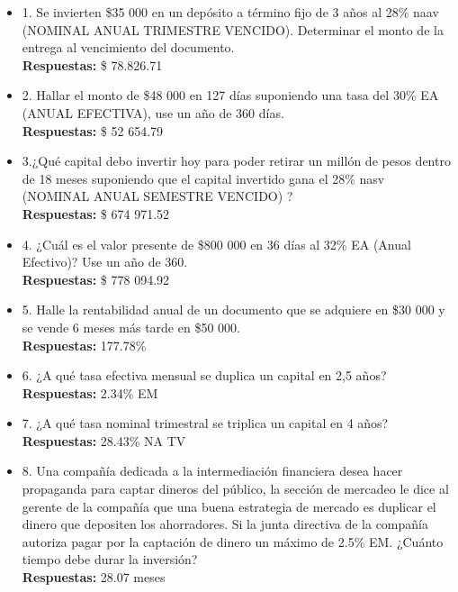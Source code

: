 \begin{itemize}
	
	\item 1.	Se invierten \$35 000 en un depósito a término fijo de 3 años al 28\% naav (NOMINAL ANUAL TRIMESTRE VENCIDO).  Determinar el monto de la entrega al vencimiento del documento.  \\
	\textbf{Respuestas:} \$ 78.826.71
	\medskip
	
	\item 2. Hallar el monto de \$48 000 en 127 días suponiendo una tasa del 30\% EA (ANUAL EFECTIVA), use un año de 360 días.\\
	\textbf{Respuestas:} \$ 52 654.79
	\medskip
	
	\item 3.¿Qué capital debo invertir hoy para poder retirar un millón de pesos dentro de 18 meses suponiendo que el capital invertido gana el 28\%  nasv (NOMINAL ANUAL SEMESTRE VENCIDO) ?\\
	
	\textbf{Respuestas:} \$ 674 971.52
	\medskip
	
	\item 4. ¿Cuál es el valor presente de \$800 000 en 36 días al 32\% EA (Anual Efectivo)? Use un año de 360.\\
	\textbf{Respuestas:} \$ 778 094.92
	\medskip
	
	\item 5. Halle la rentabilidad anual de un documento que se adquiere en \$30 000 y se vende 6 meses más tarde en \$50 000. \\
	\textbf{Respuestas:} 177.78\%
	\medskip
	
	\item 6. ¿A qué tasa efectiva mensual se duplica un capital en 2,5 años?  \\
	\textbf{Respuestas:} 2.34\% EM
	\medskip
	
	\item 7. ¿A qué tasa nominal trimestral se triplica un capital en 4 años?\\
	\textbf{Respuestas:} 28.43\% NA	TV
	\medskip
	
	\item 8. Una compañía dedicada a la intermediación financiera desea hacer propaganda para captar dineros del público, la sección de mercadeo le dice al gerente de la compañía que una buena estrategia de mercado es duplicar el dinero que depositen los ahorradores. Si la junta directiva de la compañía autoriza pagar por la captación de dinero un máximo de 2.5\% EM. ¿Cuánto tiempo debe durar la inversión?  \\
	\textbf{Respuestas:} 28.07 meses
	\medskip
	

\end{itemize}
